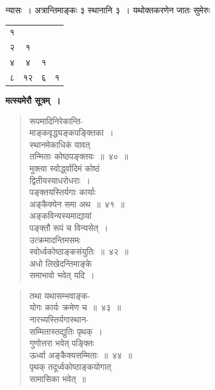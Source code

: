 \documentclass[11pt, openany]{book}
\begin{document}
\newpage

न्यासः~। अत्रान्तिमाङ्कः ३ स्थानानि ३~। यथोक्तकरणेन जातः सुमेरुः
\vspace{2mm}

\begin{table}[h]
	\centering
	\begin{tabular}{|c|c|c|c|}
		\cline{1-1}
		{\hbox{१}} &  \multicolumn{1}{c}{}  & \multicolumn{1}{c}{} & \multicolumn{1}{c}{}   \\
		\cline{1-2}
		{\hbox{२}} & {\hbox{१}} & 	\multicolumn{1}{c}{}  & 	\multicolumn{1}{c}{} \\
			\cline{1-3}
		{\hbox{४}} & {\hbox{४}} & 	{\hbox{१}}   & 	\multicolumn{1}{c}{} \\
			\cline{1-4}
			{\hbox{८}} & {\hbox{१२}} & 	{\hbox{६}}   & 	{\hbox{१}}\\
			\cline{1-4}
\end{tabular}
\end{table}
\vspace{4mm}

\textbf{मत्स्यमेरौ सूत्रम्~। }

\begin{quote}
{\gk रूपमादिनिरेकान्ति-\\
माङ्कवृद्ध्यङ्कपङ्क्तिका~।\\
स्थानमेकाधिकं यावत्\\
तन्मिताः कोष्ठपङ्क्तयः~॥~४०~॥\\
मुक्त्वा स्वोर्द्ध्वादिमं कोष्ठं\\
द्वितीयस्याधरोधराः~।\\
पङ्क्तयस्तिर्यगाः कार्याः\\
अङ्कैक्येन समा अथ~॥~४१~॥\\
अङ्कविन्यस्यमाद्यायां\\
पङ्क्तौ रूपं च विन्यसेत्~।\\
उत्क्रमादन्तिमसमः\\
स्वोर्ध्वकोष्ठाङ्कसंयुतिः~॥~४२~॥\\
अधो लिखेदन्तिमाङ्के\\
समाभावो भवेत् यदि~।}
\end{quote}

\newpage

\begin{quote}
{\gk तथा यथासम्भवाङ्क-\\
योगः कार्यः क्रमेण च~॥~४३~॥\\
नारच्यस्तिर्यगास्थान-\\
सम्मितास्तद्युतिः पृथक्~।\\
गुणोत्तरा भवेत् पङ्क्तिः\\
ऊर्ध्वा अङ्कैक्यसम्मिताः~॥~४४~॥\\
पृथक् तदूर्ध्वकोष्ठाङ्कयोगात्\\
सामासिका भवेत्~॥~	}
\end{quote}
\end{document}
